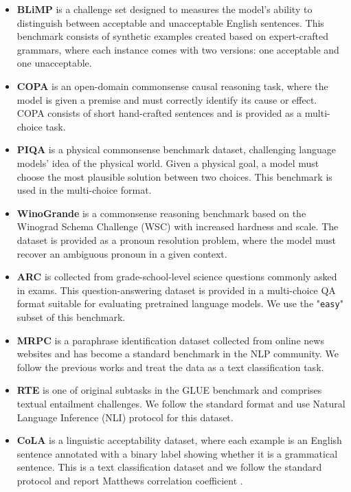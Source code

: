\documentclass[letterpaper, 12pt]{report}
\begin{document}
\begin{itemize}
    \item \textbf{BLiMP} \citep{warstadt-etal-2020-blimp}
    is a challenge set designed to measures the model's ability to distinguish between acceptable and unacceptable English sentences. This benchmark consists of synthetic examples created based on expert-crafted grammars, where each instance comes with two versions: one acceptable and one unacceptable.
    \item \textbf{COPA} \citep{Gordon2012:COPA} is an open-domain commonsense causal reasoning task, where the model is given a premise and must correctly identify its cause or effect. COPA consists of short hand-crafted sentences and is provided as a multi-choice task.
    \item  \textbf{PIQA} \citep{Bisk2020:PIQA} is a physical commonsense benchmark dataset, challenging language models' idea of the physical world. Given a physical goal, a model must choose the most plausible solution between two choices. This benchmark is used in the multi-choice format.
    \item \textbf{WinoGrande} \citep{Sakaguchi2020:WINOGRANDE} is a commonsense reasoning benchmark based on the Winograd Schema Challenge (WSC) \citep{Levesque2011:WSC} with increased hardness and scale. The dataset is provided as a pronoun resolution problem, where the model must recover an ambiguous pronoun in a given context.

    \item \textbf{ARC} \citep{Clark2018:ARC}  is collected from grade-school-level science questions commonly asked in exams. This question-answering dataset is provided in a multi-choice QA format suitable for evaluating pretrained language models. We use the "\texttt{easy}" subset of this benchmark.

    \item \textbf{MRPC} \citep{mrpc_dolan2005automatically} is a paraphrase identification dataset collected from online news websites and has become a standard benchmark in the NLP community. We follow the previous works and treat the data as a text classification task.
    \item \textbf{RTE} \citep{Dagan2005:RTE} is one of original subtasks in the GLUE benchmark and comprises textual entailment challenges. We follow the standard format and use Natural Language Inference (NLI) protocol for this dataset.

    \item \textbf{CoLA} \citep{warstadt2018:CoLA} is a linguistic acceptability dataset, where each example is an English sentence annotated with a binary label showing whether it is a grammatical sentence. This is a text classification dataset and we follow the standard protocol and report Matthews correlation coefficient \citep{Matthews1975:mcc}.

\end{itemize}
\end{document}
